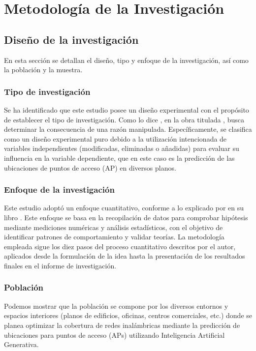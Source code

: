 \chapter{Metodología de la Investigación}
\section{Diseño de la investigación}
En esta sección se detallan el diseño, tipo y enfoque de la investigación, así como la población y la muestra.

\subsection{Tipo de investigación}
Se ha identificado que este estudio posee un diseño experimental con el propósito de establecer el tipo de investigación. Como lo dice \cite{bk_hernandez2014metodologia}, en la obra titulada , busca determinar la consecuencia de una razón manipulada. Específicamente, se clasifica como un diseño experimental puro debido a la utilización intencionada de variables independientes (modificadas, eliminadas o añadidas) para evaluar su influencia en la variable dependiente, que en este caso es la predicción de las ubicaciones de puntos de acceso (AP) en diversos planos.

\subsection{Enfoque de la investigación}
Este estudio adoptó un enfoque cuantitativo, conforme a lo explicado por \cite{bk_hernandez2014metodologia} en su libro . Este enfoque se basa en la recopilación de datos para comprobar hipótesis mediante mediciones numéricas y análisis estadísticos, con el objetivo de identificar patrones de comportamiento y validar teorías. La metodología empleada sigue los diez pasos del proceso cuantitativo descritos por el autor, aplicados desde la formulación de la idea hasta la presentación de los resultados finales en el informe de investigación.

\subsection{Población}
Podemos mostrar que la población se compone por los diversos entornos y espacios interiores (planos de edificios, oficinas, centros comerciales, etc.) donde se planea optimizar la cobertura de redes inalámbricas mediante la predicción de ubicaciones para puntos de acceso (APs) utilizando Inteligencia Artificial Generativa.

